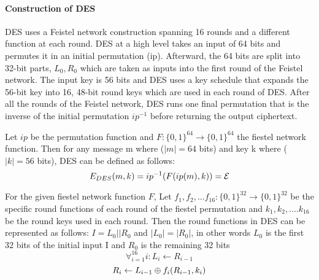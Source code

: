 
\paragraph{Construction of DES}
DES uses a Feistel network construction spanning 16 rounds and a different function at each round. DES at a high level takes an input of 64 bits and permutes it in an initial permutation (ip). Afterward, the 64 bits are split into 32-bit parts, \( L_0, R_0\) which are taken as inputs into the first round of the Feistel network. The input key is 56 bits and DES uses a key schedule that expands the 56-bit key into 16, 48-bit round keys which are used in each round of DES. After all the rounds of the Feistel network, DES runs one final permutation that is the inverse of the initial permutation $ip^{-1}$ before returning the output ciphertext.


Let $ip$ be the permutation function and $F : \{0,1\}^{64} \to \{0,1\}^{64}$ the fiestel network function. Then for any message m where (\( |m| = 64 \) bits) and key k where (\( |k| = 56 \) bits), DES can be defined as follows:
	\[ {E}_{DES} (m,k) = {ip}^{-1}(F({ip}(m), k)) = {\cal E} \] 


 For the given fiestel network function $F$, Let $f_1, f_2, ... f_{16} : \{0,1\}^{32} \to \{0,1\}^{32}$ be the specific round functions of each round of the fiestel permutation and \(k_1, k_2, .... k_16 \) be the round keys used in each round. Then the round functions in DES can be represented as follows: \newline
\( I = L_0 || R_0 \)  and \(|L_0| = |R_0|\), in other words $L_0$ is the first 32 bits of the initial input I and $R_0$ is the remaining 32 bits  \newline
\[\forall^{16}_{i=1} i : L_i \leftarrow R_{i-1} \] \[ R_i \leftarrow L_{i-1} {\:\oplus\:} {f_i}(R_{i-1}, k_i) \]



